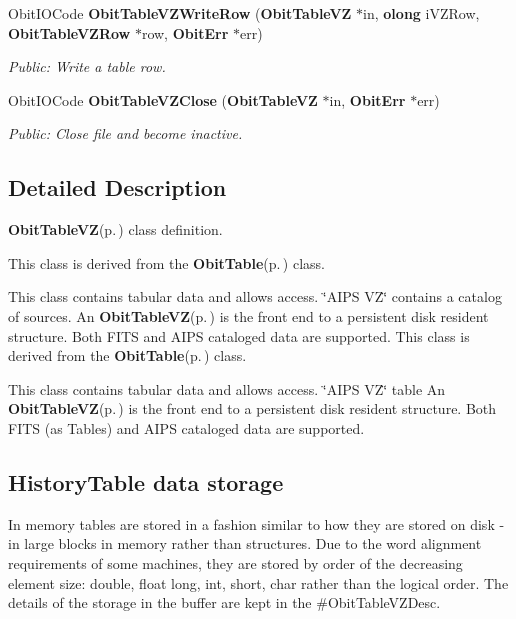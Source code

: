 \begin{CompactItemize}
Obit\-IOCode {\bf Obit\-Table\-VZWrite\-Row} ({\bf Obit\-Table\-VZ} $\ast$in, {\bf olong} i\-VZRow, {\bf Obit\-Table\-VZRow} $\ast$row, {\bf Obit\-Err} $\ast$err)
\begin{CompactList}\small\item\em Public: Write a table row. \item\end{CompactList}\item 
Obit\-IOCode {\bf Obit\-Table\-VZClose} ({\bf Obit\-Table\-VZ} $\ast$in, {\bf Obit\-Err} $\ast$err)
\begin{CompactList}\small\item\em Public: Close file and become inactive. \item\end{CompactList}\end{CompactItemize}


\subsection{Detailed Description}
{\bf Obit\-Table\-VZ}{\rm (p.\,\pageref{structObitTableVZ})} class definition. 

This class is derived from the {\bf Obit\-Table}{\rm (p.\,\pageref{structObitTable})} class.

This class contains tabular data and allows access. \char`\"{}AIPS VZ\char`\"{} contains a catalog of sources. An {\bf Obit\-Table\-VZ}{\rm (p.\,\pageref{structObitTableVZ})} is the front end to a persistent disk resident structure. Both FITS and AIPS cataloged data are supported. This class is derived from the {\bf Obit\-Table}{\rm (p.\,\pageref{structObitTable})} class.

This class contains tabular data and allows access. \char`\"{}AIPS VZ\char`\"{} table An {\bf Obit\-Table\-VZ}{\rm (p.\,\pageref{structObitTableVZ})} is the front end to a persistent disk resident structure. Both FITS (as Tables) and AIPS cataloged data are supported.\subsection{History\-Table data storage}\label{ObitTableWX_8h_TableDataStorage}
In memory tables are stored in a fashion similar to how they are stored on disk - in large blocks in memory rather than structures. Due to the word alignment requirements of some machines, they are stored by order of the decreasing element size: double, float long, int, short, char rather than the logical order. The details of the storage in the buffer are kept in the \#Obit\-Table\-VZDesc.

